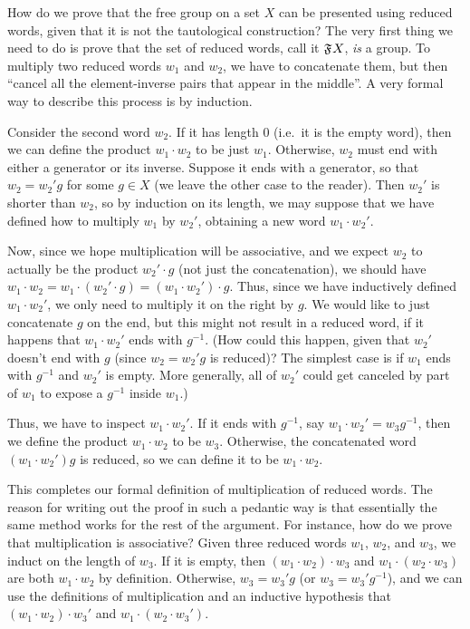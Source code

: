 How do we prove that the free group on a set $X$ can be presented using reduced words, given that it is not the tautological construction?
The very first thing we need to do is prove that the set of reduced words, call it $\mathfrak{F}_{}X$, \emph{is} a group.
To multiply two reduced words $w_1$ and $w_2$, we have to concatenate them, but then ``cancel all the element-inverse pairs that appear in the middle''.
A very formal way to describe this process is by induction.

Consider the second word $w_2$.
If it has length $0$ (i.e.\ it is the empty word), then we can define the product $w_1\cdot w_2$ to be just $w_1$.
Otherwise, $w_2$ must end with either a generator or its inverse.
Suppose it ends with a generator, so that $w_2 = w_2' g$ for some $g\in X$ (we leave the other case to the reader).
Then $w_2'$ is shorter than $w_2$, so by induction on its length, we may suppose that we have defined how to multiply $w_1$ by $w_2'$, obtaining a new word $w_1 \cdot w_2'$.

Now, since we hope multiplication will be associative, and we expect $w_2$ to actually be the product $w_2' \cdot g$ (not just the concatenation), we should have $w_1 \cdot w_2 = w_1 \cdot (w_2'\cdot g) = (w_1\cdot w_2')\cdot g$.
Thus, since we have inductively defined $w_1\cdot w_2'$, we only need to multiply it on the right by $g$.
We would like to just concatenate $g$ on the end, but this might not result in a reduced word, if it happens that $w_1\cdot w_2'$ ends with $g^{-1}$.
(How could this happen, given that $w_2'$ doesn't end with $g$ (since $w_2 = w_2'g$ is reduced)?
The simplest case is if $w_1$ ends with $g^{-1}$ and $w_2'$ is empty.
More generally, all of $w_2'$ could get canceled by part of $w_1$ to expose a $g^{-1}$ inside $w_1$.)

Thus, we have to inspect $w_1\cdot w_2'$.
If it ends with $g^{-1}$, say $w_1\cdot w_2' = w_3 g^{-1}$, then we define the product $w_1 \cdot w_2$ to be $w_3$.
Otherwise, the concatenated word $(w_1\cdot w_2')g$ is reduced, so we can define it to be $w_1\cdot w_2$.

This completes our formal definition of multiplication of reduced words.
The reason for writing out the proof in such a pedantic way is that essentially the same method works for the rest of the argument.
For instance, how do we prove that multiplication is associative?
Given three reduced words $w_1$, $w_2$, and $w_3$, we induct on the length of $w_3$.
If it is empty, then $(w_1\cdot w_2)\cdot w_3$ and $w_1 \cdot (w_2 \cdot w_3)$ are both $w_1\cdot w_2$ by definition.
Otherwise, $w_3 = w_3'g$ (or $w_3 = w_3'g^{-1}$), and we can use the definitions of multiplication and an inductive hypothesis that $(w_1\cdot w_2)\cdot w_3'$ and $w_1 \cdot (w_2 \cdot w_3')$.


